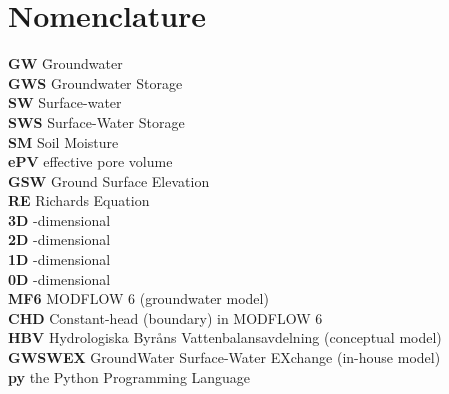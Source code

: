 \chapter*{Nomenclature}
\begin{tabbing}
    \textbf{GW} \hspace{.6in}\= Groundwater\\[0.5ex]
    \textbf{GWS} \> Groundwater Storage\\[0.5ex]
    \textbf{SW} \> Surface-water\\[0.5ex]
    \textbf{SWS} \> Surface-Water Storage\\[0.5ex]
    \textbf{SM} \> Soil Moisture\\[0.5ex]
    \textbf{ePV} \> effective pore volume\\[0.5ex]
    \textbf{GSW} \> Ground Surface Elevation\\[0.5ex]
    \textbf{RE} \> Richards Equation\\[0.5ex]
    \textbf{3D} -dimensional\\[0.5ex]
    \textbf{2D} -dimensional\\[0.5ex]
    \textbf{1D} -dimensional\\[0.5ex]
    \textbf{0D} -dimensional\\[0.5ex]
    \textbf{MF6} \> MODFLOW 6 (groundwater model)\\[0.5ex]
    \textbf{CHD} \>Constant-head (boundary) in MODFLOW 6\\[0.5ex]
    \textbf{HBV} \> Hydrologiska Byråns Vattenbalansavdelning (conceptual model)\\[0.5ex]
    \textbf{GWSWEX} \> GroundWater Surface-Water EXchange (in-house model)\\[0.5ex]
    \textbf{py} \> the Python Programming Language\\[0.5ex]
\end{tabbing}